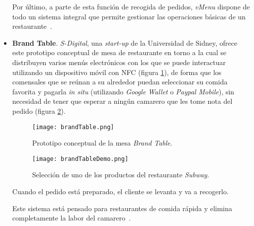 \begin{itemize}
    Por último, a parte de esta función de recogida de pedidos, \emph{vMenu} 
    dispone de todo un sistema integral que permite gestionar las operaciones
    básicas de un restaurante~\cite{bib:VMENU}.

    \item \textbf{Brand Table}. \emph{S-Digital}, una \emph{start-up} de la
    Universidad de Sidney, ofrece este prototipo conceptual de mesa de
    restaurante en torno a la cual se distribuyen varios menús electrónicos con
    los que se puede interactuar utilizando un dispositivo móvil con \acs{NFC}
    (figura \ref{fig:brandTable}), de forma que los comensales que se reúnan a 
    su alrededor puedan seleccionar su comida favorita y pagarla
    \emph{in situ} (utilizando \emph{Google Wallet} o \emph{Paypal Mobile}), 
    sin necesidad de tener que esperar a ningún camarero que les tome nota del 
    pedido (figura \ref{fig:brandTableDemo}).

    \begin{figure}[!h]
      \begin{center}
        \texttt{[image: brandTable.png]}
        \caption{Prototipo conceptual de la mesa \emph{Brand Table}.}
        \label{fig:brandTable}
      \end{center}
    \end{figure}

    \begin{figure}[!h]
      \begin{center}
        \texttt{[image: brandTableDemo.png]}
        \caption{Selección de uno de los productos del restaurante
        \emph{Subway}.}
        \label{fig:brandTableDemo}
      \end{center}
    \end{figure}

    Cuando el pedido está preparado, el cliente se levanta y va a recogerlo.
    
    Este sistema está pensado para restaurantes de comida rápida y elimina
    completamente la labor del camarero~\cite{bib:brandTable}.
    \end{itemize}


